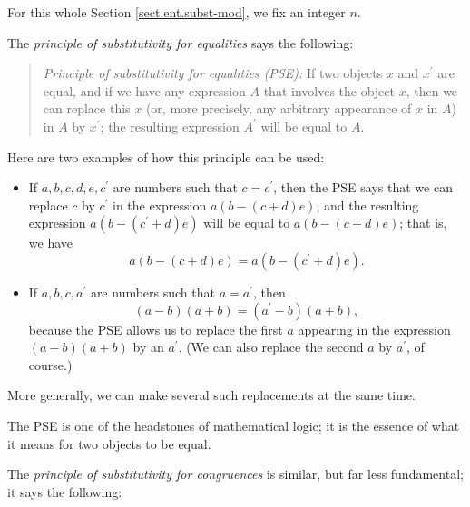 \documentclass[numbers=enddot,12pt,final,onecolumn,notitlepage]{scrartcl}%
\numberwithin{exer}{subsection}
\theoremstyle{definition}
\newenvironment{statement}{\begin{quote}}{\end{quote}}
\begin{document}
For this whole Section \ref{sect.ent.subst-mod}, we fix an integer $n$.

The \textit{principle of substitutivity for equalities} says the following:

\begin{statement}
\textit{Principle of substitutivity for equalities (PSE):} If two objects $x$
and $x^{\prime}$ are equal, and if we have any expression $A$ that involves
the object $x$, then we can replace this $x$ (or, more precisely, any
arbitrary appearance of $x$ in $A$) in $A$ by $x^{\prime}$; the resulting
expression $A^{\prime}$ will be equal to $A$.
\end{statement}

Here are two examples of how this principle can be used:

\begin{itemize}
\item If $a,b,c,d,e,c^{\prime}$ are numbers such that $c=c^{\prime}$, then the
PSE says that we can replace $c$ by $c^{\prime}$ in the expression $a\left(
b-\left(  c+d\right)  e\right)  $, and the resulting expression $a\left(
b-\left(  c^{\prime}+d\right)  e\right)  $ will be equal to $a\left(
b-\left(  c+d\right)  e\right)  $; that is, we have%
\begin{equation}
a\left(  b-\left(  c+d\right)  e\right)  =a\left(  b-\left(  c^{\prime
}+d\right)  e\right)  . \label{eq.mod.substitutivity-nums.1}%
\end{equation}


\item If $a,b,c,a^{\prime}$ are numbers such that $a=a^{\prime}$, then
\begin{equation}
\left(  a-b\right)  \left(  a+b\right)  =\left(  a^{\prime}-b\right)  \left(
a+b\right)  , \label{eq.mod.substitutivity-nums.2}%
\end{equation}
because the PSE allows us to replace the first $a$ appearing in the expression
$\left(  a-b\right)  \left(  a+b\right)  $ by an $a^{\prime}$. (We can also
replace the second $a$ by $a^{\prime}$, of course.)
\end{itemize}

More generally, we can make several such replacements at the same time.

The PSE is one of the headstones of mathematical logic; it is the essence of
what it means for two objects to be equal.

The \textit{principle of substitutivity for congruences} is similar, but far
less fundamental; it says the following:
\end{document}
